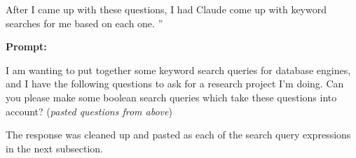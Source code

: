After I came up with these questions, I had Claude come up with keyword searches for me based on each one. ''

\begin{framed}
    \textbf{Prompt:} \vspace{5pt}

    I am wanting to put together some keyword search queries for database engines, and I have the following questions to ask for a research project I'm doing. Can you please make some boolean search queries which take these questions into account? (\textit{pasted questions from above})

\end{framed}

The response was cleaned up and pasted as each of the search query expressions in the next subsection.

